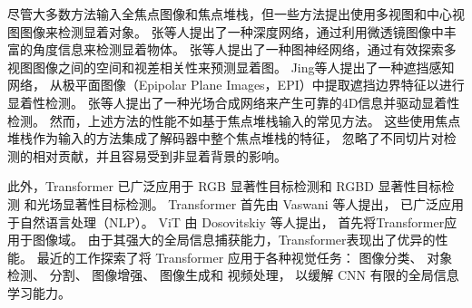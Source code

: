 



尽管大多数方法输入全焦点图像和焦点堆栈，但一些方法提出使用多视图和中心视图图像来检测显着对象。 
张等人提出了一种深度网络，通过利用微透镜图像中丰富的角度信息来检测显着物体。 
张等人提出了一种图神经网络，通过有效探索多视图图像之间的空间和视差相关性来预测显着图。 
Jing等人提出了一种遮挡感知网络，
从极平面图像（Epipolar Plane Images，EPI）中提取遮挡边界特征以进行显着性检测。 
张等人提出了一种光场合成网络来产生可靠的4D信息并驱动显着性检测。 
然而，上述方法的性能不如基于焦点堆栈输入的常见方法。 
这些使用焦点堆栈作为输入的方法集成了解码器中整个焦点堆栈的特征，
忽略了不同切片对检测的相对贡献，并且容易受到非显着背景的影响。 




此外，Transformer 已广泛应用于 
RGB 显著性目标检测和 
RGBD 显著性目标检测
和光场显著性目标检测。
Transformer 首先由 Vaswani 等人提出，
已广泛应用于自然语言处理（NLP）。
ViT 由 Dosovitskiy 等人提出，
首先将Transformer应用于图像域。
由于其强大的全局信息捕获能力，Transformer表现出了优异的性能。
最近的工作探索了将 Transformer 应用于各种视觉任务：
图像分类、
对象检测、
分割、
图像增强、
图像生成和 
视频处理，
以缓解 CNN 有限的全局信息学习能力。



